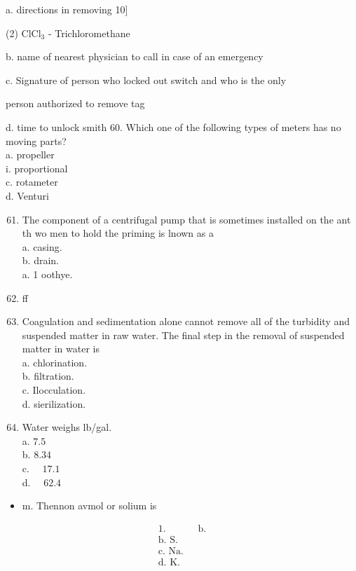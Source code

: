 \documentclass[10pt]{article}
\begin{document}
a. directions in removing 10$]$

(2) $\mathrm{ClCl}_{3}$ - Trichloromethane

b. name of nearest physician to call in case of an emergency

c. Signature of person who locked out switch and who is the only

person authorized to remove tag

d. time to unlock smith 60. Which one of the following types of meters has no moving parts?\\
a. propeller\\
i. proportional\\
c. rotameter\\
d. Venturi

\begin{enumerate}
  \setcounter{enumi}{60}
  \item The component of a centrifugal pump that is sometimes installed on the ant th wo men to hold the priming is lnown as a\\
a. casing.\\
b. drain.\\
a. 1 oothye.

  \item ff

  \item Coagulation and sedimentation alone cannot remove all of the turbidity and suspended matter in raw water. The final step in the removal of suspended matter in water is\\
a. chlorination.\\
b. filtration.\\
c. Ilocculation.\\
d. sierilization.

  \item Water weighs lb/gal.\\
a. $7.5$\\
b. $8.34$\\
c. $\quad 17.1$\\
d. $\quad 62.4$

\end{enumerate}

\begin{itemize}
  \item m. Thennon avmol or solium is
\end{itemize}

$$
\begin{array}{ll}
\text { 1. } & \text { b. } \\
\text { b. S. } \\
\text { c. Na. } \\
\text { d. K. }
\end{array}
$$
\end{document}
